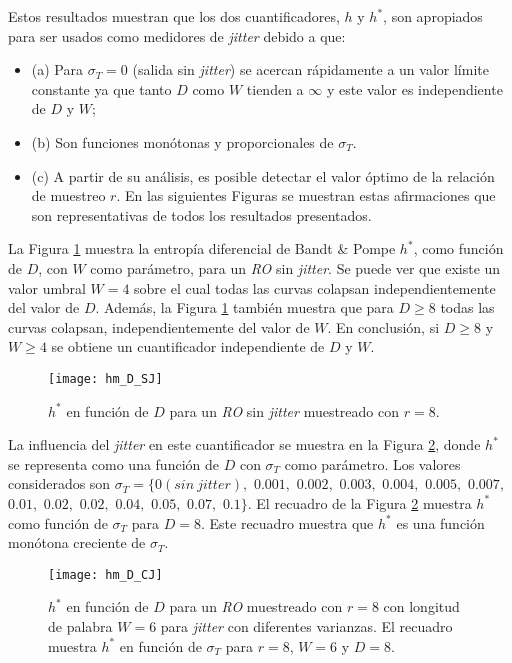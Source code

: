 Estos resultados muestran que los dos cuantificadores, $h$ y $h^*$, son apropiados para ser usados como medidores de \textit{jitter} debido a que: 
\begin{itemize} 
\item (a) Para $\sigma_T=0$ (salida sin \textit{jitter}) se acercan rápidamente a un valor límite constante ya que tanto $D$ como $W$ tienden a $\infty$ y este valor es independiente de $D$ y $W$; 
\item (b) Son funciones monótonas y proporcionales de $\sigma_T$.
\item (c) A partir de su análisis, es posible detectar el valor óptimo de la relación de muestreo $r$.
En las siguientes Figuras se muestran estas afirmaciones que son representativas de todos los resultados presentados.
\end{itemize}
%
La Figura \ref{fig:hm_D_SJ} muestra la entropía diferencial de Bandt \& Pompe $h^*$, como función de $D$, con $W$ como parámetro, para un \textit{RO} sin \textit{jitter}.
Se puede ver que existe un valor umbral $W = 4$ sobre el cual todas las curvas colapsan independientemente del valor de $D$.
Además, la Figura \ref{fig:hm_D_SJ} también muestra que para $D \ge 8$ todas las curvas colapsan, independientemente del valor de $W$.
En conclusión, si $D \ge 8$ y $W \ge 4$ se obtiene un cuantificador independiente de $D$ y $W$.
%
\begin{figure}
	\centering
	\texttt{[image: hm\_D\_SJ]}
	\caption{$h^*$ en función de $D$ para un \emph{RO} sin \textit{jitter} muestreado con $r=8$.}
	\label{fig:hm_D_SJ}
\end{figure}

La influencia del \textit{jitter} en este cuantificador se muestra en la Figura \ref{fig:hm_D_CJ}, donde $h^*$ se representa como una función de $D$ con $\sigma_T$ como parámetro.
Los valores considerados son $\sigma_T=\{0 (sin~jitter),$ $0.001,$ $0.002,$ $0.003,$ $0.004,$ $0.005,$ $0.007,$ $0.01,$ $0.02,$ $0.02,$ $0.04,$ $0.05,$ $0.07,$ $0.1\}$.
El recuadro de la Figura \ref{fig:hm_D_CJ} muestra $h^*$ como función de $\sigma_T$ para $D = 8$.
Este recuadro muestra que $h^*$ es una función monótona creciente de $\sigma_T$.
%
\begin{figure}
	\centering
	\texttt{[image: hm\_D\_CJ]}
	\caption{$h^*$ en función de $D$ para un \emph{RO} muestreado con $r=8$ con longitud de palabra $W=6$ para \textit{jitter} con diferentes varianzas. El recuadro muestra $h^*$ en función de $\sigma_T$ para $r=8$, $W=6$ y $D=8$.}
	\label{fig:hm_D_CJ}
\end{figure}

